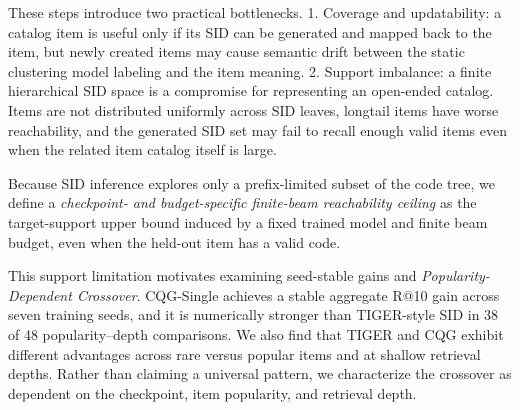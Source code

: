 \documentclass[preprint,12pt]{elsarticle}
\begin{document}
These steps introduce two practical bottlenecks. 1. Coverage and updatability: a catalog item is useful only if its SID can be generated and mapped back to the item, but newly created items may cause semantic drift between the static clustering model labeling and the item meaning. 2. Support imbalance: a finite hierarchical SID space is a compromise for representing an open-ended catalog. Items are not distributed uniformly across SID leaves, longtail items have worse reachability, and the generated SID set may fail to recall enough valid items even when the related item catalog itself is large.

Because SID inference explores only a prefix-limited subset of the code tree,
we define a \emph{checkpoint- and budget-specific finite-beam reachability
ceiling} as the target-support upper bound induced by a fixed trained model and finite beam budget, even when
the held-out item has a valid code.

This support limitation motivates examining seed-stable gains and \emph{Popularity-Dependent
Crossover}. CQG-Single achieves a stable
aggregate R@10 gain across seven training seeds, and it is
numerically stronger than TIGER-style SID in 38 of 48 popularity--depth
comparisons. 
We also find that TIGER and CQG exhibit different advantages across rare versus popular items and at shallow retrieval depths. Rather than claiming a universal pattern, we characterize the crossover as dependent on the checkpoint, item popularity, and retrieval depth. 
\end{document}
